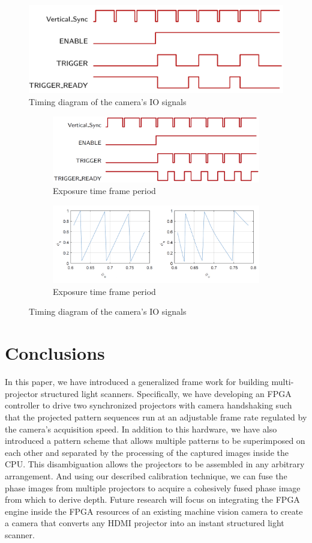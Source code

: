 \documentclass[]{spie}  %
\begin{document}
\begin{figure}[!t]
  \includegraphics[width=\linewidth]{gpio.png}
  \caption{Timing diagram of the camera's IO signals}
  \label{Fig:5}
\end{figure}

\begin{figure}
\centering
\begin{subfigure}{.5\textwidth}
  \centering
  \includegraphics[width=.5\linewidth]{phase2.png}
  \caption{Exposure time \< frame period}
  \label{fig:sub3}
\end{subfigure}%
\begin{subfigure}{.5\textwidth}
  \centering
   \includegraphics[width=.5\linewidth]{phase.png}
  \caption{Exposure time \> frame period}
  \label{fig:sub4}
\end{subfigure}
\caption{Timing diagram of the camera's IO signals}
\label{Fig:7}
\end{figure}


\section{Conclusions}
In this paper, we have introduced a generalized frame work for building multi-projector structured light scanners. Specifically, we have developing an FPGA controller to drive two synchronized projectors with camera handshaking such that the projected pattern sequences run at an adjustable frame rate regulated by the camera's acquisition speed.  In addition to this hardware, we have also introduced a pattern scheme that allows multiple patterns to be superimposed on each other and separated by the processing of the captured images inside the CPU.  This disambiguation allows the projectors to be assembled in any arbitrary arrangement.  And using our described calibration technique, we can fuse the phase images from multiple projectors to acquire a cohesively fused phase image from which to derive depth. Future research will focus on integrating the FPGA engine inside the FPGA resources of an existing machine vision camera to create a camera that converts any HDMI projector into an instant structured light scanner.
\end{document}
